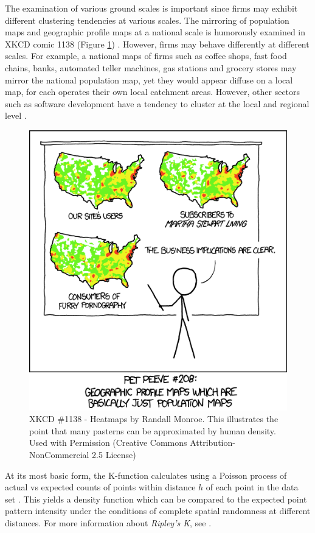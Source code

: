 The examination of various ground scales is important since firms may exhibit different clustering tendencies at various scales.  The mirroring of population maps and geographic profile maps at a national scale is humorously examined in XKCD comic 1138 (Figure \ref{fig:heatmapxkcd}) \citep{XKCD1138}.  However, firms may behave differently at different scales.  For example, a national maps of firms such as coffee shops, fast food chains, banks, automated teller machines, gas stations and grocery stores may mirror the national population map, yet they would appear diffuse on a local map, for each operates their own local catchment areas.  However, other sectors such as software development have a tendency to cluster at the local and regional level \citep{Meyer2006}.  

\begin{figure}
	\centering
	\includegraphics[width=0.7\linewidth]{Figures/ChapterIII/heatmap_XKCD}
	\caption[XKCD 1138 - Heatmaps]{XKCD \#1138 - Heatmaps by Randall Monroe. This illustrates the point that many pasterns can be approximated by human density. Used with Permission (Creative Commons Attribution-NonCommercial 2.5 License)}
	\label{fig:heatmapxkcd}
\end{figure}

At its most basic form, the K-function calculates using a Poisson process of actual vs expected counts of points within distance $h$ of each point in the data set \citep{dixon2014r}.  This yields a density function which can be compared to the expected point pattern intensity under the conditions of complete spatial randomness at different distances.  For more information about\textit{ Ripley's K}, see \cite{ripley1976second,fischer2009handbook,spatstatBook}.

